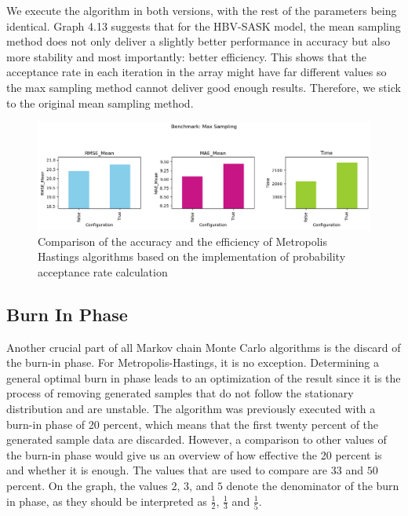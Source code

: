 We execute the algorithm in both versions, with the rest of the parameters being identical. Graph 4.13 suggests that for the HBV-SASK model, the mean sampling method does not only deliver a slightly better performance in accuracy but also more stability and most importantly: better efficiency. This shows that the acceptance rate in each iteration in the array might have far different values so the max sampling method cannot deliver good enough results. Therefore, we stick to the original mean sampling method.


\begin{figure}[H]
    \centering
    \includegraphics[width=1\textwidth]{figures/basic_mh/benchmark/max_sampling.png}
    \captionsetup{width=.8\textwidth}
    \caption{Comparison of the accuracy and the efficiency of Metropolis Hastings algorithms based on the implementation of probability acceptance rate calculation}
    \label{fig:enter-label}
\end{figure}



\subsection{Burn In Phase}
Another crucial part of all Markov chain Monte Carlo algorithms is the discard of the burn-in phase. For Metropolis-Hastings, it is no exception. Determining a general optimal burn in phase leads to an optimization of the result since it is the process of removing generated samples that do not follow the stationary distribution and are unstable. The algorithm was previously executed with a burn-in phase of 20 percent, which means that the first twenty percent of the generated sample data are discarded. However, a comparison to other values of the burn-in phase would give us an overview of how effective the 20 percent is and whether it is enough. The values that are used to compare are $33$ and $50$ percent. On the graph, the values $2$, $3$, and $5$ denote the denominator of the burn in phase, as they should be interpreted as $\frac 1 2$, $\frac 1 3$ and $\frac 1 5$.

